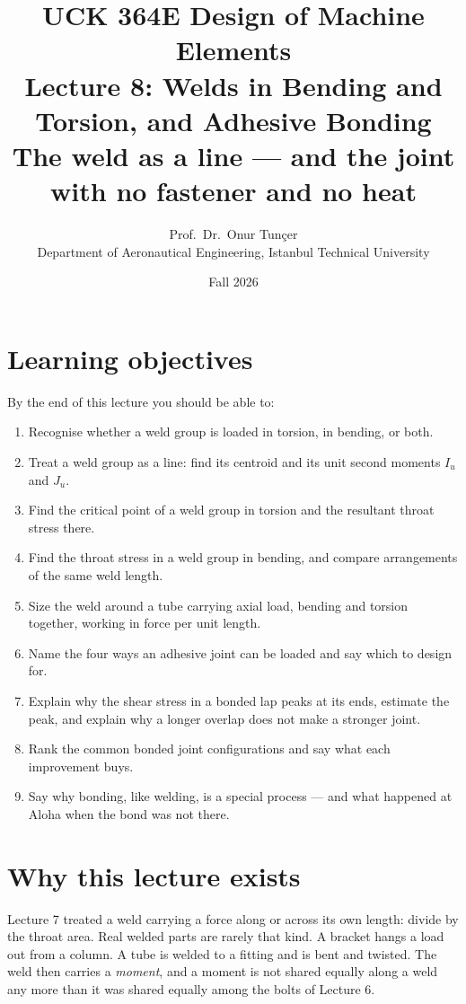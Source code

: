 \documentclass[11pt,a4paper]{article}
\title{\textbf{UCK 364E Design of Machine Elements}\\[4pt]
\Large Lecture 8: Welds in Bending and Torsion, and Adhesive Bonding\\[2pt]
\large The weld as a line --- and the joint with no fastener and no heat}
\author{Prof.\ Dr.\ Onur Tunçer\\ Department of Aeronautical Engineering, Istanbul Technical University}
\date{Fall 2026}
\begin{document}
\maketitle

\section*{Learning objectives}
By the end of this lecture you should be able to:
\begin{enumerate}[nosep]
  \item Recognise whether a weld group is loaded in torsion, in bending, or both.
  \item Treat a weld group as a line: find its centroid and its unit second moments $I_u$ and $J_u$.
  \item Find the critical point of a weld group in torsion and the resultant throat stress there.
  \item Find the throat stress in a weld group in bending, and compare arrangements of the same
        weld length.
  \item Size the weld around a tube carrying axial load, bending and torsion together, working in
        force per unit length.
  \item Name the four ways an adhesive joint can be loaded and say which to design for.
  \item Explain why the shear stress in a bonded lap peaks at its ends, estimate the peak, and
        explain why a longer overlap does not make a stronger joint.
  \item Rank the common bonded joint configurations and say what each improvement buys.
  \item Say why bonding, like welding, is a special process --- and what happened at Aloha when
        the bond was not there.
\end{enumerate}

\section{Why this lecture exists}

Lecture 7 treated a weld carrying a force along or across its own length: divide by the throat
area. Real welded parts are rarely that kind. A bracket hangs a load out from a column. A tube is
welded to a fitting and is bent and twisted. The weld then carries a \emph{moment}, and a moment is
not shared equally along a weld any more than it was shared equally among the bolts of Lecture 6.
\end{document}
